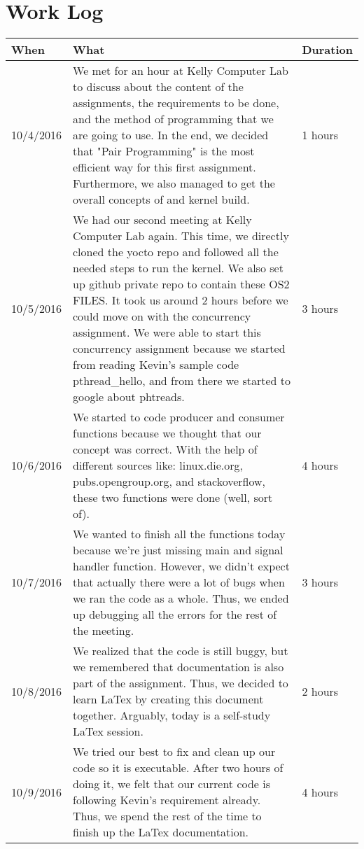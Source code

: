 \documentclass[letterpaper,10pt,draftclsnofoot,titlepage,onecolumn]{IEEEtran}
\begin{document}
\section{Work Log}
\begin{center}
\begin{tabular}{ |m{2cm}|m{10cm}|m{2cm}| }
\hline
When & What & Duration \\ \hline
10/4/2016 & We met for an hour at Kelly Computer Lab to discuss about the content of the assignments, the requirements to be done, and the method of programming that we are going to use. In the end, we decided that "Pair Programming" is the most efficient way for this first assignment. Furthermore, we also managed to get the overall concepts of  and kernel build. & 1 hours\\ \hline
10/5/2016 & We had our second meeting at Kelly Computer Lab again. This time, we directly cloned the yocto repo and followed all the needed steps to run the kernel. We also set up github private repo to contain these OS2 FILES. It took us around 2 hours before we could move on with the concurrency assignment. We were able to start this concurrency assignment because we started from reading Kevin's sample code pthread\_hello, and from there we started to google about phtreads. & 3 hours\\ \hline
10/6/2016 & We started to code producer and consumer functions because we thought that our concept was correct. With the help of different sources like: linux.die.org, pubs.opengroup.org, and stackoverflow, these two functions were done (well, sort of). & 4 hours\\ \hline
10/7/2016 & We wanted to finish all the functions today because we're just missing main and signal handler function. However, we didn't expect that actually there were a lot of bugs when we ran the code as a whole. Thus, we ended up debugging all the errors for the rest of the meeting. & 3 hours\\ \hline
10/8/2016 & We realized that the code is still buggy, but we remembered that documentation is also part of the assignment. Thus, we decided to learn LaTex by creating this document together. Arguably, today is a self-study LaTex session. & 2 hours\\ \hline
10/9/2016 & We tried our best to fix and clean up our code so it is executable. After two hours of doing it, we felt that our current code is following Kevin's requirement already. Thus, we spend the rest of the time to finish up the LaTex documentation. & 4 hours\\
\hline
\end{tabular}
\end{center}
	
\end{document}
